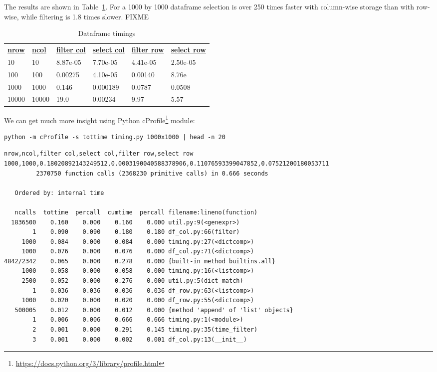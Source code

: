 \documentclass{scrbook}
\newcommand{\tblref}[1]{Table~\ref{#1}}
\newcommand{\hreffoot}[2]{{#1}\footnote{\href{#2}{#2}}}
\begin{document}
The results are shown in \tblref{dataframe-timing}.
For a 1000 by 1000 dataframe
selection is over 250 times faster with column-wise storage than with row-wise,
while filtering is 1.8 times slower.
FIXME

\begin{table}
\begin{tabular}{llllll}
\textbf{\underline{nrow}} & \textbf{\underline{ncol}} & \textbf{\underline{filter col}} & \textbf{\underline{select col}} & \textbf{\underline{filter row}} & \textbf{\underline{select row}} \\
10 & 10 & 8.87e-05 & 7.70e-05 & 4.41e-05 & 2.50e-05 \\
100 & 100 & 0.00275 & 4.10e-05 & 0.00140 & 8.76e \\
1000 & 1000 & 0.146 & 0.000189 & 0.0787 & 0.0508 \\
10000 & 10000 & 19.0 & 0.00234 & 9.97 & 5.57 \\
\end{tabular}
\caption{Dataframe timings}
\label{dataframe-timing}
\end{table}



We can get much more insight using Python \hreffoot{cProfile}{https://docs.python.org/3/library/profile.html} module:


\begin{lstlisting}[frame=single,frameround=tttt]
python -m cProfile -s tottime timing.py 1000x1000 | head -n 20
\end{lstlisting}



\begin{lstlisting}[frame=single,frameround=tttt]
nrow,ncol,filter col,select col,filter row,select row
1000,1000,0.18020892143249512,0.0003190040588378906,0.11076593399047852,0.07521200180053711
         2370750 function calls (2368230 primitive calls) in 0.666 seconds

   Ordered by: internal time

   ncalls  tottime  percall  cumtime  percall filename:lineno(function)
  1836500    0.160    0.000    0.160    0.000 util.py:9(<genexpr>)
        1    0.090    0.090    0.180    0.180 df_col.py:66(filter)
     1000    0.084    0.000    0.084    0.000 timing.py:27(<dictcomp>)
     1000    0.076    0.000    0.076    0.000 df_col.py:71(<dictcomp>)
4842/2342    0.065    0.000    0.278    0.000 {built-in method builtins.all}
     1000    0.058    0.000    0.058    0.000 timing.py:16(<listcomp>)
     2500    0.052    0.000    0.276    0.000 util.py:5(dict_match)
        1    0.036    0.036    0.036    0.036 df_row.py:63(<listcomp>)
     1000    0.020    0.000    0.020    0.000 df_row.py:55(<dictcomp>)
   500005    0.012    0.000    0.012    0.000 {method 'append' of 'list' objects}
        1    0.006    0.006    0.666    0.666 timing.py:1(<module>)
        2    0.001    0.000    0.291    0.145 timing.py:35(time_filter)
        3    0.001    0.000    0.002    0.001 df_col.py:13(__init__)
\end{lstlisting}
\end{document}
